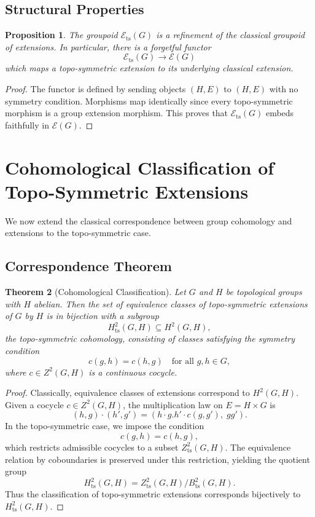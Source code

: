 \documentclass[11pt,a4paper]{article}
\theoremstyle{plain}
\newtheorem{theorem}{Theorem}[section]
\newtheorem{proposition}[theorem]{Proposition}
\theoremstyle{definition}
\theoremstyle{remark}
\begin{document}
	\subsection{Structural Properties}
	
	\begin{proposition}
		The groupoid $\mathcal{E}_{\mathrm{ts}}(G)$ is a refinement of the classical groupoid of extensions.  
		In particular, there is a forgetful functor
		\[
		\mathcal{E}_{\mathrm{ts}}(G) \longrightarrow \mathcal{E}(G)
		\]
		which maps a topo-symmetric extension to its underlying classical extension.
	\end{proposition}
	
	\begin{proof}
		The functor is defined by sending objects $(H,E)$ to $(H,E)$ with no symmetry condition.  
		Morphisms map identically since every topo-symmetric morphism is a group extension morphism.  
		This proves that $\mathcal{E}_{\mathrm{ts}}(G)$ embeds faithfully in $\mathcal{E}(G)$.  
	\end{proof}
	
	\section{Cohomological Classification of Topo-Symmetric Extensions}
	
	We now extend the classical correspondence between group cohomology and extensions to the topo-symmetric case.
	
	\subsection{Correspondence Theorem}
	
	\begin{theorem}[Cohomological Classification]
		Let $G$ and $H$ be topological groups with $H$ abelian.  
		Then the set of equivalence classes of topo-symmetric extensions of $G$ by $H$ is in bijection with a subgroup
		\[
		H^2_{\mathrm{ts}}(G,H) \subseteq H^2(G,H),
		\]
		the \emph{topo-symmetric cohomology}, consisting of classes satisfying the symmetry condition
		\[
		c(g,h) = c(h,g) \quad \text{for all } g,h \in G,
		\]
		where $c \in Z^2(G,H)$ is a continuous cocycle.
	\end{theorem}
	
	\begin{proof}
		Classically, equivalence classes of extensions correspond to $H^2(G,H)$.  
		Given a cocycle $c \in Z^2(G,H)$, the multiplication law on $E = H \times G$ is
		\[
		(h,g) \cdot (h',g') = (h \cdot g.h' \cdot c(g,g'),\; gg').
		\]
		In the topo-symmetric case, we impose the condition
		\[
		c(g,h) = c(h,g),
		\]
		which restricts admissible cocycles to a subset $Z^2_{\mathrm{ts}}(G,H)$.  
		The equivalence relation by coboundaries is preserved under this restriction, yielding the quotient group
		\[
		H^2_{\mathrm{ts}}(G,H) = Z^2_{\mathrm{ts}}(G,H)/B^2_{\mathrm{ts}}(G,H).
		\]
		Thus the classification of topo-symmetric extensions corresponds bijectively to $H^2_{\mathrm{ts}}(G,H)$.  
	\end{proof}
	
\end{document}
